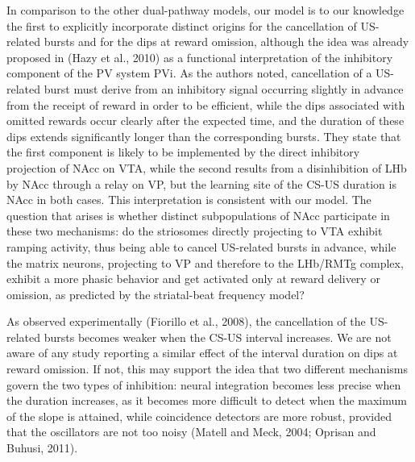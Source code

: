 \documentclass[
  11pt,
  a4paper,
]{scrbook}
\begin{document}
In comparison to the other dual-pathway models, our model is to our
knowledge the first to explicitly incorporate distinct origins for the
cancellation of US-related bursts and for the dips at reward omission,
although the idea was already proposed in (Hazy et al., 2010) as a
functional interpretation of the inhibitory component of the PV system
PVi. As the authors noted, cancellation of a US-related burst must
derive from an inhibitory signal occurring slightly in advance from the
receipt of reward in order to be efficient, while the dips associated
with omitted rewards occur clearly after the expected time, and the
duration of these dips extends significantly longer than the
corresponding bursts. They state that the first component is likely to
be implemented by the direct inhibitory projection of NAcc on VTA, while
the second results from a disinhibition of LHb by NAcc through a relay
on VP, but the learning site of the CS-US duration is NAcc in both
cases. This interpretation is consistent with our model. The question
that arises is whether distinct subpopulations of NAcc participate in
these two mechanisms: do the striosomes directly projecting to VTA
exhibit ramping activity, thus being able to cancel US-related bursts in
advance, while the matrix neurons, projecting to VP and therefore to the
LHb/RMTg complex, exhibit a more phasic behavior and get activated only
at reward delivery or omission, as predicted by the striatal-beat
frequency model?

As observed experimentally (Fiorillo et al., 2008), the cancellation of
the US-related bursts becomes weaker when the CS-US interval increases.
We are not aware of any study reporting a similar effect of the interval
duration on dips at reward omission. If not, this may support the idea
that two different mechanisms govern the two types of inhibition: neural
integration becomes less precise when the duration increases, as it
becomes more difficult to detect when the maximum of the slope is
attained, while coincidence detectors are more robust, provided that the
oscillators are not too noisy (Matell and Meck, 2004; Oprisan and
Buhusi, 2011).
\end{document}
